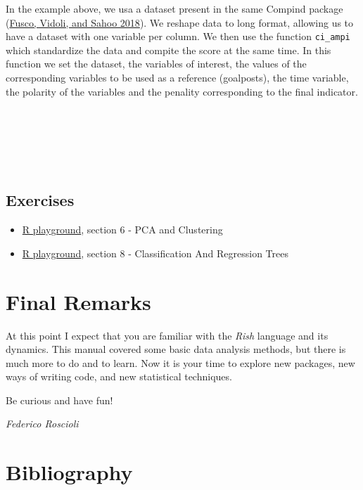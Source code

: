 \documentclass[
]{article}
\begin{document}
In the example above, we usa a dataset present in the same Compind
package (\protect\hyperlink{ref-compind}{Fusco, Vidoli, and Sahoo 2018}). We reshape data to long format, allowing us to have
a dataset with one variable per column. We then use the function
\texttt{ci\_ampi} which standardize the data and compite the score at the same
time. In this function we set the dataset, the variables of interest,
the values of the corresponding variables to be used as a reference
(goalposts), the time variable, the polarity of the variables and the
penality corresponding to the final indicator.

~

~

~

\hypertarget{exercises-5}{%
\subsection{Exercises}\label{exercises-5}}

\begin{itemize}
\item
  \href{https://federicoroscioli.shinyapps.io/exercises/}{R playground},
  section 6 - PCA and Clustering
\item
  \href{https://federicoroscioli.shinyapps.io/exercises/}{R playground},
  section 8 - Classification And Regression Trees
\end{itemize}

\newpage

\newpage

\hypertarget{final-remarks}{%
\section*{Final Remarks}\label{final-remarks}}

At this point I expect that you are familiar with the \emph{Rish} language
and its dynamics. This manual covered some basic data analysis methods,
but there is much more to do and to learn. Now it is your time to
explore new packages, new ways of writing code, and new statistical
techniques.

Be curious and have fun!

\emph{Federico Roscioli}

\newpage

\hypertarget{bibliography}{%
\section*{Bibliography}\label{bibliography}}
\end{document}
